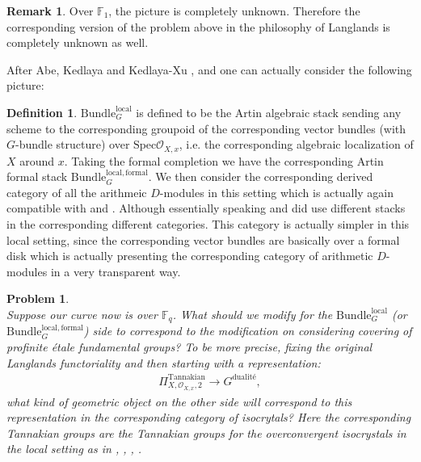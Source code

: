 \documentclass[12pt]{book}
\newtheorem{problem}{Problem}
\theoremstyle{definition}
\newtheorem{definition}{Definition}
\newtheorem{remark}{Remark}
\begin{document}
\begin{remark}
Over $\mathbb{F}_1$, the picture is completely unknown. Therefore the corresponding version of the problem above in the philosophy of Langlands is completely unknown as well.
\end{remark}

\indent After Abe, Kedlaya and Kedlaya-Xu \cite{AI}, \cite{KI} and \cite{KXII} one can actually consider the following picture:

\begin{definition}
$\mathrm{Bundle}^\mathrm{local}_G$ is defined to be the Artin algebraic stack sending any scheme to the corresponding groupoid of the corresponding vector bundles (with $G$-bundle structure) over $\mathrm{Spec}\mathcal{O}_{X,x}$, i.e. the corresponding algebraic localization of $X$ around $x$. Taking the formal completion we have the corresponding Artin formal stack $\mathrm{Bundle}^\mathrm{local,formal}_G$. We then consider the corresponding derived category of all the arithmeic $D$-modules in this setting which is actually again compatible with \cite{FS} and \cite{GL}. Although essentially speaking \cite{FS} and \cite{GL} did use different stacks in the corresponding different categories. This category is actually simpler in this local setting, since the corresponding vector bundles are basically over a formal disk which is actually presenting the corresponding category of arithmetic $D$-modules in a very transparent way.
 \end{definition}


\begin{problem}\mbox{}\\
Suppose our curve now is over $\mathbb{F}_q$. What should we modify for the $\mathrm{Bundle}^\mathrm{local}_G$ (or $\mathrm{Bundle}^\mathrm{local,formal}_G$) side to correspond to the modification on considering covering of profinite \'etale fundamental groups? To be more precise, fixing the original Langlands functoriality and then starting with a representation:
\begin{align}
\Pi^\mathrm{Tannakian}_{X,\mathcal{O}_{X,x},2} \rightarrow G^\text{dualit\'e},
\end{align}
what kind of geometric object on the other side will correspond to this representation in the corresponding category of isocrytals? Here the corresponding Tannakian groups are the Tannakian groups for the overconvergent isocrystals in the local setting as in \cite{AI}, \cite{KI}, \cite{KXII}, \cite{DK}.
\end{problem}
\end{document}
